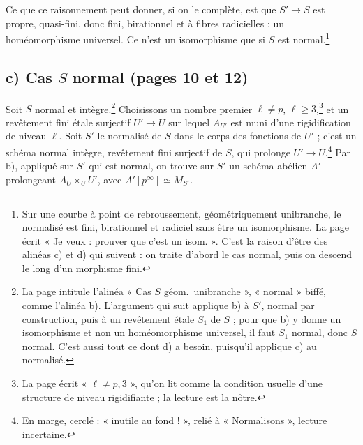 \documentclass[11pt,a4paper]{article}
\begin{document}
Ce que ce raisonnement peut donner, si on le complète, est que $S' \to S$ est
propre, quasi-fini, donc fini, birationnel et à fibres radicielles : un
homéomorphisme universel. Ce n'est un isomorphisme que si $S$ est
normal.\footnote{Sur une courbe à point de rebroussement, géométriquement
unibranche, le normalisé est fini, birationnel et radiciel sans être un
isomorphisme. La page écrit « Je veux : prouver que c'est un isom. ». C'est
la raison d'être des alinéas c) et d) qui suivent : on traite d'abord le cas
normal, puis on descend le long d'un morphisme fini.}

\subsection*{c) Cas $S$ normal (pages 10 et 12)}

Soit $S$ normal et intègre.\footnote{La page intitule l'alinéa « Cas $S$
géom.\ unibranche », « normal » biffé, comme l'alinéa b). L'argument qui
suit applique b) à $S'$, normal par construction, puis à un revêtement étale
$S_1$ de $S$ ; pour que b) y donne un isomorphisme et non un homéomorphisme
universel, il faut $S_1$ normal, donc $S$ normal. C'est aussi tout ce dont d)
a besoin, puisqu'il applique c) au normalisé.} Choisissons un nombre premier $\ell \neq p$,
$\ell \geq 3$,\footnote{La page écrit « $\ell \neq p, 3$ », qu'on lit comme
la condition usuelle d'une structure de niveau rigidifiante ; la lecture est
la nôtre.} et un revêtement fini étale surjectif $U' \to U$ sur lequel
$A_{U'}$ est muni d'une rigidification de niveau $\ell$. Soit $S'$ le
normalisé de $S$ dans le corps des fonctions de $U'$ ; c'est un schéma normal
intègre, revêtement fini surjectif de $S$, qui prolonge $U' \to U$.\footnote{En
marge, cerclé : « inutile au fond ! », relié à « Normalisons », lecture
incertaine.} Par b),
appliqué sur $S'$ qui est normal, on trouve sur $S'$ un schéma abélien $A'$
prolongeant $A_U \times_U U'$, avec $A'[p^\infty] \simeq M_{S'}$.
\end{document}
